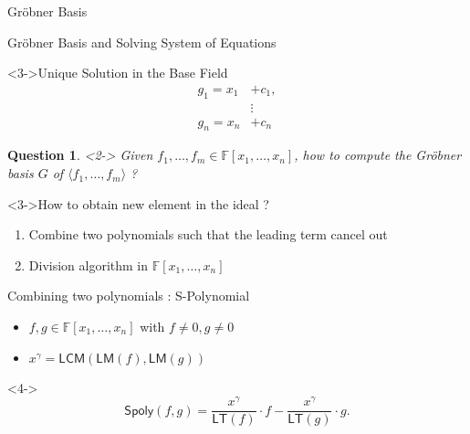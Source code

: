 \documentclass{beamer}
\newcommand{\Field}{\mathbb{F}}
\newcommand{\Ideal}[1]{\langle #1 \rangle}
\newcommand{\LT}[1]{\mathsf{LT}(#1)}
\newcommand{\LM}[1]{\mathsf{LM}(#1)}
\newcommand{\mpolyring}[3]{#1[#2_{1}, \ldots, #2_{#3}]}
\newcommand{\LCM}[2]{\mathsf{LCM}(#1, #2)}
\newcommand{\LCMLM}[2]{\LCM{\LM{#1}}{\LM{#2}}}
\newcommand{\Spoly}[2]{\mathsf{Spoly}(#1, #2)}
\newcommand{\Grobner}{Gr\"{o}bner }
\newtheorem{question}{Question}
\begin{document}
\begin{section}{\Grobner Basis}
\begin{frame}{\Grobner Basis and Solving System of Equations}
    \begin{block}<3->{Unique Solution in the Base Field}
      \begin{align*}
        g_1 = x_1 &+ c_1,\\
            &\vdots\\
        g_n = x_n &+ c_n
      \end{align*}
    \end{block}
  \end{frame}

  \begin{frame}
    \begin{question}<2->
      Given $f_1, \ldots, f_m \in \mpolyring{\Field}{x}{n}$, how to compute the \Grobner basis $G$ of $\Ideal{f_1, \ldots, f_m}$ ?
    \end{question}

    \begin{block}<3->{How to obtain new element in the ideal ?}
      \begin{enumerate}
      \item<4-> Combine two polynomials such that the leading term cancel out
      \item<5-> Division algorithm in $\mpolyring{\Field}{x}{n}$
      \end{enumerate}
    \end{block}
  \end{frame}

  \begin{frame}{Combining two polynomials : S-Polynomial}
    \begin{itemize}
    \item<2-> $f, g \in \mpolyring{\Field}{x}{n}$ with $f \neq 0, g \neq 0$
    \item<3-> $x^{\gamma} = \LCMLM{f}{g}$
    \end{itemize}
    \begin{definition}<4->
      $$
      \Spoly{f}{g} = \dfrac{x^{\gamma}}{\LT{f}} \cdot f -
      \dfrac{x^{\gamma}}{\LT{g}} \cdot g.
      $$
    \end{definition}
  \end{frame}


\end{section}
\end{document}
